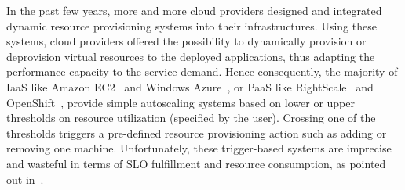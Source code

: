 



In the past few years, more and more cloud providers designed and integrated dynamic resource provisioning systems into their infrastructures.  Using these systems, cloud providers offered the possibility to dynamically provision or deprovision virtual resources to the deployed applications, thus adapting the performance capacity to the service demand. Hence consequently, the majority of IaaS like Amazon EC2~\cite{amazonEC2} and Windows Azure~\cite{azure-project}, or PaaS like RightScale~\cite{right-scale} and OpenShift~\cite{openshift}, provide simple autoscaling systems based on lower or upper thresholds on resource utilization (specified by the user).  Crossing one of the thresholds triggers a pre-defined resource provisioning action such as adding or removing one machine. Unfortunately, these trigger-based systems are imprecise and wasteful in terms of SLO fulfillment and resource consumption, as pointed out in~\cite{ghanbari_exploring_2011}.






